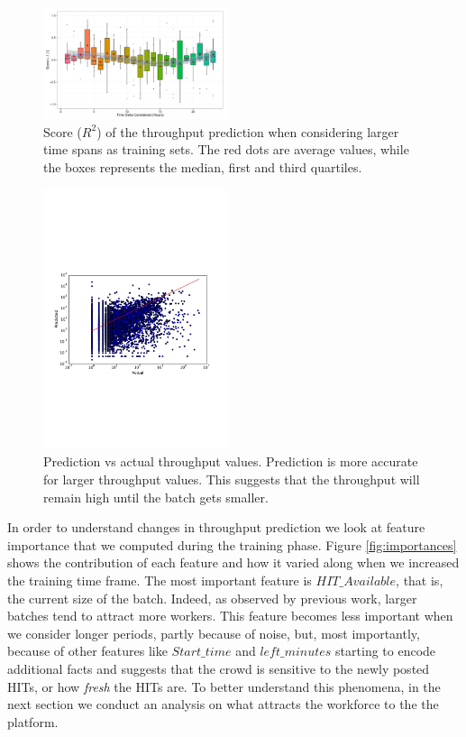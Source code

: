 \begin{figure}[tb]
	\centering
		\includegraphics[width=0.48\textwidth]{figures/ML_accuracy}
	\caption{Score ($R^2$) of the throughput prediction when considering larger time spans as training sets. The red dots are average values, while the boxes represents the median, first and third quartiles.}
	\label{fig:accuracy}
\end{figure}

\begin{figure}[tb]
	\centering
		\includegraphics[width=0.48\textwidth]{figures/predictions_3}
	\caption{Prediction vs actual throughput values. Prediction is more accurate for larger throughput values. This suggests that the throughput will remain high until the batch gets smaller.}
	\label{fig:pred}
\end{figure}

In order to understand  changes in throughput prediction we  look at  feature importance that we computed during   the training phase. Figure \ref{fig:importances} shows the  contribution of each feature and how it varied along when we increased the training time frame.
The most important feature is $HIT\_Available$, that is, the current size of the batch. Indeed, as observed by previous work, larger batches tend to attract more workers\cite{mturk,crowddb}. This feature becomes less important when we consider longer periods, partly because of  noise, but, most importantly, because of other features like $Start\_time$ and $left\_minutes$ starting to encode additional facts and suggests that the crowd is sensitive to the newly posted HITs, or how \emph{fresh} the HITs are. To better understand this phenomena, in the next section we conduct an analysis on what attracts the workforce to the the platform.

